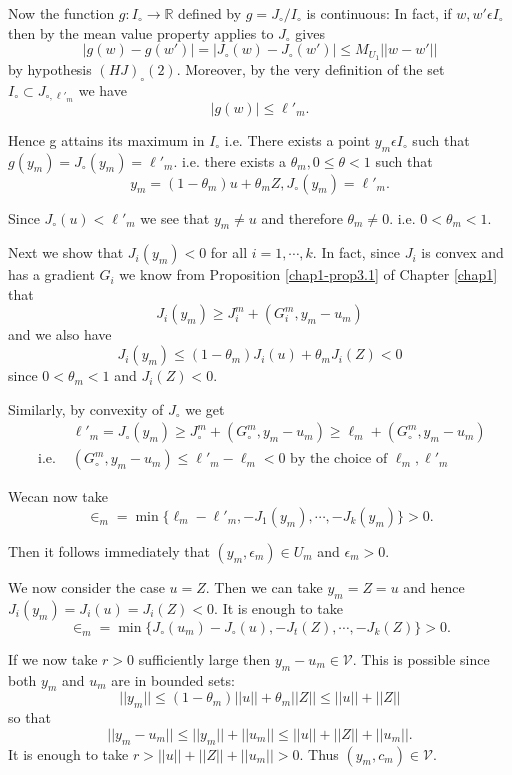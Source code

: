 Now the function $g : I_{\circ} \to \mathbb{R}$ defined by $g = J_{\circ} / I_{\circ}$ is continuous: In fact, if $w, w' \epsilon I_{\circ}$ then by the mean value property applies to $J_{\circ}$ gives
$$
|g(w) - g(w')| = |J_{\circ} (w) - J_{\circ}(w')| \leq M_{U_{1}} ||w-w'||
$$
by hypothesis $(HJ)_{\circ} (2)$. Moreover, by the very definition of the set $I_{\circ} \subset J_{\circ, \ell'_{m}}$ we have
$$
|g(w)| \leq \ell'_{m}.
$$

Hence g attains its maximum in $I_{\circ}$ i.e. There exists a point $y_{m} \epsilon I_{\circ}$ such that $g(y_{m}) = J_{\circ}(y_{m}) = \ell'_{m}$. i.e. there exists a $\theta_{m}, 0 \leq \theta < 1$ such that
$$
y_{m} = (1-\theta_{m})u + \theta_{m} Z, J_{\circ} (y_{m}) = \ell'_{m}.
$$

Since $J_{\circ}(u) < \ell'_{m}$ we see that $y_{m} \neq u$ and therefore $\theta_{m} \neq 0$. i.e. $0 < \theta_{m} < 1$.

Next we show that $J_{i}(y_{m}) < 0$ for all $i = 1, \cdots, k$. In fact, since $J_{i}$ is convex and has a gradient $G_{i}$ we know from Proposition \ref{chap1-prop3.1} of Chapter \ref{chap1} that
$$
J_{i} (y_{m}) \geq J_{i}^{m} + (G_{i}^{m}, y_{m} - u_{m})
$$
and we also have
$$
J_{i}(y_{m}) \leq (1-\theta_{m}) J_{i}(u) + \theta_{m} J_{i}(Z) < 0
$$
since $0 < \theta_{m} < 1$ and $J_{i}(Z) < 0$.

Similarly, by convexity of $J_{\circ}$ we get
\begin{align*}
& \ell'_{m} = J_{\circ}(y_{m}) \geq J_{\circ}^{m} + (G_{\circ}^{m}, y_{m} - u_{m}) \geq \ell_{m} + (G_{\circ}^{m}, y_{m} - u_{m})\\
\text{ i.e. } & (G_{\circ}^{m}, y_{m} - u_{m}) \leq \ell'_{m} - \ell_{m} < 0 \text{ by the choice of } \ell_{m}, \ell'_{m}
\end{align*}

We\pageoriginale can now take
$$
\in_{m} = \min \{\ell_{m} - \ell'_{m}, -J_{1} (y_{m}), \cdots, -J_{k}(y_{m})\} > 0.
$$

Then it follows immediately that $(y_{m},\epsilon_{m}) \in U_{m}$ and $\epsilon_{m} > 0$.

We now consider the case $u = Z$. Then we can take $y_{m} = Z = u$ and hence $J_{i}(y_{m}) = J_{i}(u) = J_{i} (Z) < 0$. It is enough to take
$$
\in_{m} = \min \{J_{\circ} (u_{m}) - J_{\circ}(u), -J_{t}(Z), \cdots, -J_{k}(Z)\} > 0.
$$

If we now take $r > 0$ sufficiently large then $y_{m} - u_{m} \in \mathscr{V}$. This is possible since both $y_{m}$ and $u_{m}$ are in bounded sets:
$$
||y_{m}|| \leq (1-\theta_{m}) ||u|| + \theta_{m} ||Z|| \leq ||u|| + ||Z||
$$
so that
$$
||y_{m}-u_{m}|| \leq ||y_{m}|| + ||u_{m}|| \leq ||u|| + ||Z|| + ||u_{m}||.
$$
It is enough to take $r > ||u|| + ||Z|| + ||u_{m}|| > 0$. Thus $(y_{m}, c_{m}) \in \mathscr{V}$.

